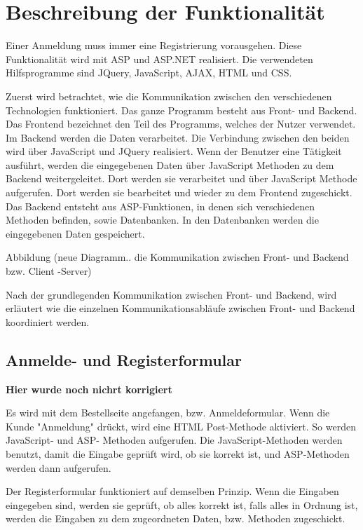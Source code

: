 \section{Beschreibung der Funktionalität}   

Einer Anmeldung muss immer eine Registrierung vorausgehen. Diese Funktionalität wird mit ASP und ASP.NET realisiert. Die verwendeten Hilfsprogramme sind JQuery, JavaScript, AJAX, HTML und CSS. 

Zuerst wird betrachtet, wie die Kommunikation zwischen den verschiedenen Technologien funktioniert. Das ganze Programm besteht aus Front- und Backend. Das Frontend bezeichnet den Teil des Programms, welches der Nutzer verwendet. Im Backend werden die Daten verarbeitet. Die Verbindung zwischen den beiden wird über JavaScript und JQuery realisiert. Wenn der Benutzer eine Tätigkeit ausführt, werden die eingegebenen Daten über JavaScript Methoden zu dem Backend weitergeleitet. Dort werden sie verarbeitet und über JavaScript Methode aufgerufen. Dort werden sie bearbeitet und wieder zu dem Frontend zugeschickt. Das Backend entsteht aus ASP-Funktionen, in denen sich verschiedenen Methoden befinden, sowie Datenbanken. In den Datenbanken werden die eingegebenen Daten gespeichert.

Abbildung (neue Diagramm.. die Kommunikation zwischen Front- und Backend bzw. Client -Server)

Nach der grundlegenden Kommunikation zwischen Front- und Backend, wird erläutert wie die einzelnen Kommunikationsabläufe zwischen Front- und Backend koordiniert werden.

\subsection{Anmelde- und Registerformular} 

\textbf{Hier wurde noch nichrt korrigiert}

Es wird mit dem Bestellseite angefangen, bzw. Anmeldeformular. Wenn die Kunde "Anmeldung" drückt, wird eine HTML Post-Methode aktiviert.  So werden JavaScript- und ASP- Methoden aufgerufen. Die JavaScript-Methoden werden benutzt, damit die Eingabe geprüft wird, ob sie korrekt ist, und ASP-Methoden werden dann aufgerufen. 

Der Registerformular funktioniert auf demselben Prinzip. Wenn die Eingaben eingegeben sind, werden sie geprüft, ob alles korrekt ist, falls alles in Ordnung ist, werden die Eingaben zu dem zugeordneten Daten, bzw. Methoden zugeschickt.

